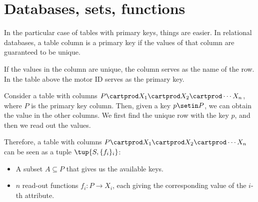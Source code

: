 
\section{Databases, sets, functions}

%
%
%


In the particular case of tables with primary keys, things are easier.
In relational databases, a table column is a primary key if the values of that column are guaranteed to be unique.

If the values in the column are unique, the column serves as the name of the row.
In the table above the motor ID serves as the primary key.

Consider a table with columns $P \cartprod X_1 \cartprod X_2 \cartprod \cdots X_n$, where $P$ is the primary key column.
Then, given a key $p \setin P$, we can obtain the value in the other columns.
We first find the unique row with the key $p$, and then we read out the values.

Therefore, a table with columns $P \cartprod X_1 \cartprod X_2 \cartprod \cdots X_n$ can be seen as a tuple $\tup{S, \{f_i\}_i}$:
\begin{itemize}
    \item A subset $A \subseteq P$ that gives us the available keys.
    \item $n$ read-out functions $f_i\colon P \to X_i$, each giving the corresponding value of the $i$-th attribute.
\end{itemize}

